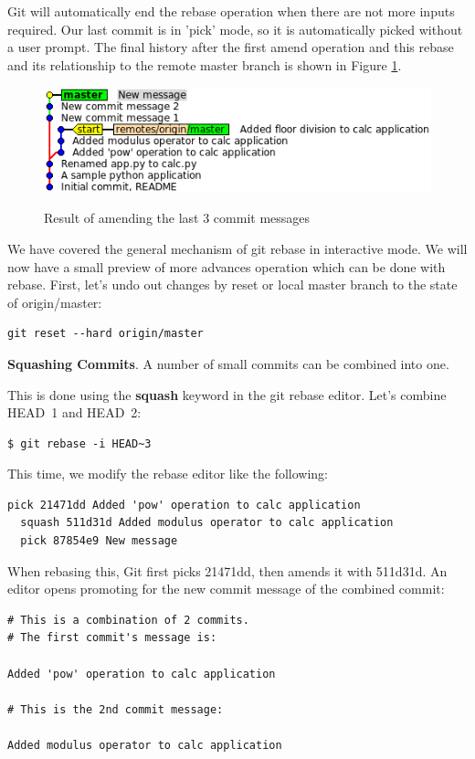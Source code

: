 \documentclass{../../common/tufte-latex/tufte-handout}
\begin{document}
Git will automatically end the rebase operation when there are not more inputs required.
Our last commit is in 'pick' mode, so it is automatically picked without a user prompt.
The final history after the first amend operation and this rebase and its relationship to the remote master branch is shown in Figure \ref{fig:gitrebase-amend}.

\begin{figure}%
  \centering
  \includegraphics[width=0.75\linewidth]{gitrebase-amend.png}
  \label{fig:gitrebase-amend}
  \caption{Result of amending the last 3 commit messages}
\end{figure}

\noindent We have covered the general mechanism of git rebase in interactive mode. 
We will now have a small preview of more advances operation which can be done with rebase.
First, let's undo out changes by reset or local master branch to the state of origin/master:

\begin{lstlisting}[style=BashInputStyle]
  git reset --hard origin/master
\end{lstlisting}

\noindent \textbf{Squashing Commits}.
A number of small commits can be combined into one.

This is done using the \textbf{squash} keyword in the git rebase editor.
Let's combine HEAD~1 and HEAD~2:

\begin{lstlisting}[style=BashInputStyle]
  $ git rebase -i HEAD~3
\end{lstlisting}

This time, we modify the rebase editor like the following:
\begin{lstlisting}[style=BashInputStyle]
  pick 21471dd Added 'pow' operation to calc application
  squash 511d31d Added modulus operator to calc application
  pick 87854e9 New message
\end{lstlisting}

When rebasing this, Git first picks 21471dd, then amends it with 511d31d.
An editor opens promoting for the new commit message of the combined commit:
\begin{lstlisting}[style=BashInputStyle]
# This is a combination of 2 commits.
# The first commit's message is:

Added 'pow' operation to calc application

# This is the 2nd commit message:

Added modulus operator to calc application
\end{lstlisting}
\end{document}
